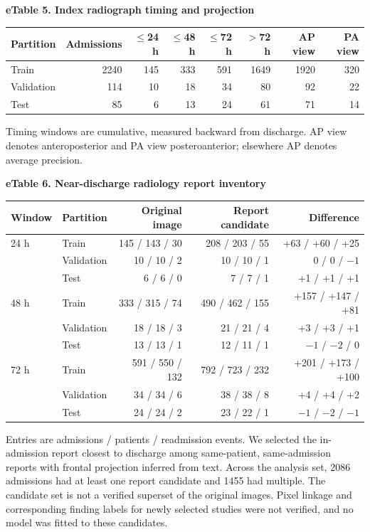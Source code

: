 \noindent\textbf{eTable 5. Index radiograph timing and projection}\par
\begin{longtable}{@{}lrrrrrrr@{}}
\toprule
Partition & Admissions & $\leq$24 h & $\leq$48 h & $\leq$72 h & $>$72 h & AP view & PA view \\
\midrule
\endhead
Train & 2240 & 145 & 333 & 591 & 1649 & 1920 & 320 \\
Validation & 114 & 10 & 18 & 34 & 80 & 92 & 22 \\
Test & 85 & 6 & 13 & 24 & 61 & 71 & 14 \\
\bottomrule
\end{longtable}
\noindent Timing windows are cumulative, measured backward from discharge. AP view denotes anteroposterior and PA view posteroanterior; elsewhere AP denotes average precision.
\medskip

\noindent\textbf{eTable 6. Near-discharge radiology report inventory}\par
\begin{longtable}{@{}llrrr@{}}
\toprule
Window & Partition & Original image & Report candidate & Difference \\
\midrule
\endhead
24 h & Train & 145 / 143 / 30 & 208 / 203 / 55 & +63 / +60 / +25 \\
 & Validation & 10 / 10 / 2 & 10 / 10 / 1 & 0 / 0 / $-1$ \\
 & Test & 6 / 6 / 0 & 7 / 7 / 1 & +1 / +1 / +1 \\
48 h & Train & 333 / 315 / 74 & 490 / 462 / 155 & +157 / +147 / +81 \\
 & Validation & 18 / 18 / 3 & 21 / 21 / 4 & +3 / +3 / +1 \\
 & Test & 13 / 13 / 1 & 12 / 11 / 1 & $-1$ / $-2$ / 0 \\
72 h & Train & 591 / 550 / 132 & 792 / 723 / 232 & +201 / +173 / +100 \\
 & Validation & 34 / 34 / 6 & 38 / 38 / 8 & +4 / +4 / +2 \\
 & Test & 24 / 24 / 2 & 23 / 22 / 1 & $-1$ / $-2$ / $-1$ \\
\bottomrule
\end{longtable}
\noindent Entries are admissions / patients / readmission events. We selected the in-admission report closest to discharge among same-patient, same-admission reports with frontal projection inferred from text. Across the analysis set, 2086 admissions had at least one report candidate and 1455 had multiple. The candidate set is not a verified superset of the original images. Pixel linkage and corresponding finding labels for newly selected studies were not verified, and no model was fitted to these candidates.
\medskip

